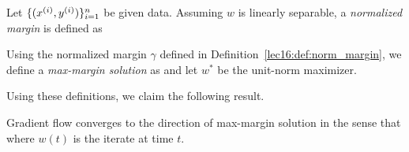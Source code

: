 \begin{definition}\label{lec16:def:norm_margin}
Let \(\{(x\sp{i}, y\sp{i}) \}_{i=1}^n \) be given data. Assuming \( w\) is linearly separable, a \textit{normalized margin} is defined as
\end{definition}

\begin{definition}
Using the normalized margin \(\gamma\) defined in Definition~\ref{lec16:def:norm_margin}, we define a \textit{max-margin solution} as
and let \(w^*\) be the unit-norm maximizer. 
\end{definition}

Using these definitions, we claim the following result.
\begin{theorem} \label{lec16:thm:maxmargin_gd}
Gradient flow converges to the direction of max-margin solution in the sense that
where \(w(t)\) is the iterate at time \(t\).
\end{theorem}

